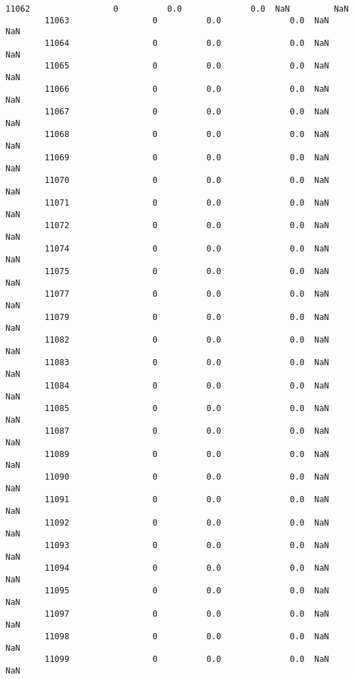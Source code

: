 \documentclass[11pt]{article}
\begin{document}
\begin{Verbatim}[commandchars=\\\{\}]
        11062                 0          0.0              0.0  NaN         NaN   
        11063                 0          0.0              0.0  NaN         NaN   
        11064                 0          0.0              0.0  NaN         NaN   
        11065                 0          0.0              0.0  NaN         NaN   
        11066                 0          0.0              0.0  NaN         NaN   
        11067                 0          0.0              0.0  NaN         NaN   
        11068                 0          0.0              0.0  NaN         NaN   
        11069                 0          0.0              0.0  NaN         NaN   
        11070                 0          0.0              0.0  NaN         NaN   
        11071                 0          0.0              0.0  NaN         NaN   
        11072                 0          0.0              0.0  NaN         NaN   
        11074                 0          0.0              0.0  NaN         NaN   
        11075                 0          0.0              0.0  NaN         NaN   
        11077                 0          0.0              0.0  NaN         NaN   
        11079                 0          0.0              0.0  NaN         NaN   
        11082                 0          0.0              0.0  NaN         NaN   
        11083                 0          0.0              0.0  NaN         NaN   
        11084                 0          0.0              0.0  NaN         NaN   
        11085                 0          0.0              0.0  NaN         NaN   
        11087                 0          0.0              0.0  NaN         NaN   
        11089                 0          0.0              0.0  NaN         NaN   
        11090                 0          0.0              0.0  NaN         NaN   
        11091                 0          0.0              0.0  NaN         NaN   
        11092                 0          0.0              0.0  NaN         NaN   
        11093                 0          0.0              0.0  NaN         NaN   
        11094                 0          0.0              0.0  NaN         NaN   
        11095                 0          0.0              0.0  NaN         NaN   
        11097                 0          0.0              0.0  NaN         NaN   
        11098                 0          0.0              0.0  NaN         NaN   
        11099                 0          0.0              0.0  NaN         NaN   
        

\end{Verbatim}
\end{document}
